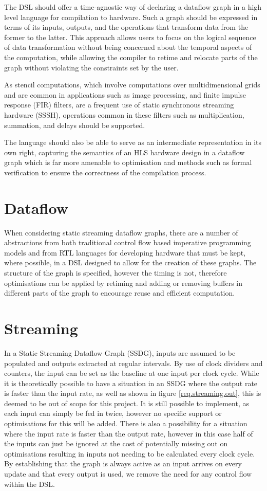 The DSL should offer a time-agnostic way of declaring a dataflow graph in a high level language for compilation to hardware. Such a graph should be expressed in terms of its inputs, outputs, and the operations that transform data from the former to the latter. This approach allows users to focus on the logical sequence of data transformation without being concerned about the temporal aspects of the computation, while allowing the compiler to retime and relocate parts of the graph without violating the constraints set by the user.

As stencil computations, which involve computations over multidimensional grids and are common in applications such as image processing, and finite impulse response (FIR) filters, are a frequent use of static synchronous streaming hardware (SSSH), operations common in these filters such as multiplication, summation, and delays should be supported.

The language should also be able to serve as an intermediate representation in its own right, capturing the semantics of an HLS hardware design in a dataflow graph which is far more amenable to optimisation and methods such as formal verification to ensure the correctness of the compilation process.

\section{Dataflow}
When considering static streaming dataflow graphs, there are a number of abstractions from both traditional control flow based imperative programming models and from RTL languages for developing hardware that must be kept, where possible, in a DSL designed to allow for the creation of these graphs. The structure of the graph is specified, however the timing is not, therefore optimisations can be applied by retiming and adding or removing buffers in different parts of the graph to encourage reuse and efficient computation.

\section{Streaming}
In a Static Streaming Dataflow Graph (SSDG), inputs are assumed to be populated and outputs extracted at regular intervals. By use of clock dividers and counters, the input can be set as the baseline at one input per clock cycle. While it is theoretically possible to have a situation in an SSDG where the output rate is faster than the input rate, as well as shown in figure \ref{req.streaming.out}, this is deemed to be out of scope for this project. It is still possible to implement, as each input can simply be fed in twice, however no specific support or optimisations for this will be added. There is also a possibility for a situation where the input rate is faster than the output rate, however in this case half of the inputs can just be ignored at the cost of potentially missing out on optimisations resulting in inputs not needing to be calculated every clock cycle. By establishing that the graph is always active as an input arrives on every update and that every output is used, we remove the need for any control flow within the DSL.

